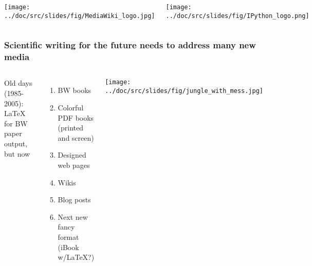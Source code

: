 \documentclass{beamer}
\begin{document}
\begin{frame}
\begin{columns}
\vspace{6mm}


\vspace{6mm}

\centerline{\texttt{[image: ../doc/src/slides/fig/MediaWiki\_logo.jpg]}}

\vspace{6mm}


\vspace{6mm}

\centerline{\texttt{[image: ../doc/src/slides/fig/IPython\_logo.png]}}

\vspace{6mm}


\end{columns}
\end{frame}

\begin{frame}
\frametitle{Scientific writing for the future needs to address many new media}


\begin{columns}
Old days (1985-2005): {\LaTeX} for BW paper output, but now

\begin{enumerate}
  \item BW books

  \item Colorful PDF books (printed and screen)

  \item Designed web pages

  \item Wikis

  \item Blog posts

  \item Next new fancy format (iBook w/LaTeX?)
\end{enumerate}

\noindent

\vspace{6mm}

\centerline{\texttt{[image: ../doc/src/slides/fig/jungle\_with\_mess.jpg]}}

\vspace{6mm}


\end{columns}
\end{frame}
\end{document}
